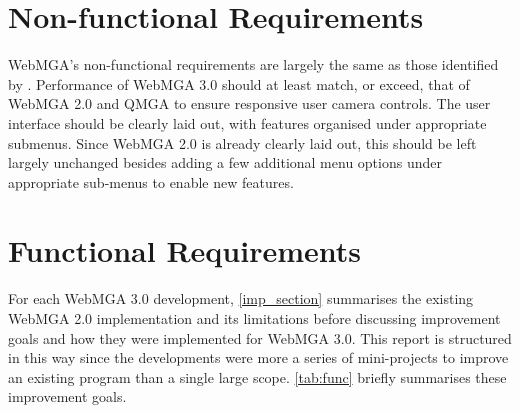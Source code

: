 \section{Non-functional Requirements}
WebMGA's non-functional requirements are largely the same as those identified by \textcite{Battistini_2021}. Performance of WebMGA 3.0 should at least match, or exceed, that of WebMGA 2.0 and QMGA to ensure responsive user camera controls. The user interface should be clearly laid out, with features organised under appropriate submenus. Since WebMGA 2.0 is already clearly laid out, this should be left largely unchanged besides adding a few additional menu options under appropriate sub-menus to enable new features.

\section{Functional Requirements}
For each WebMGA 3.0 development, \cref{imp_section} summarises the existing WebMGA 2.0 implementation and its limitations before discussing improvement goals and how they were implemented for WebMGA 3.0. This report is structured in this way since the developments were more a series of mini-projects to improve an existing program than a single large scope. \cref{tab:func} briefly summarises these improvement goals.
